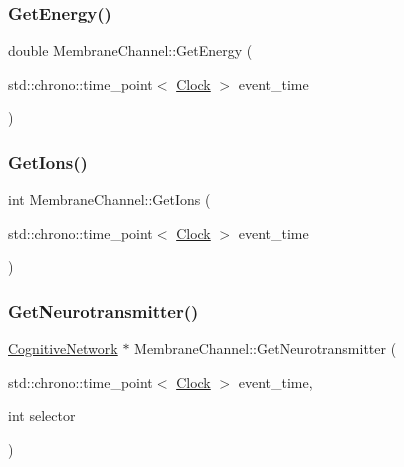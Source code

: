 \mbox{\label{classMembraneChannel_a25b542d8156c42ed785eebbea0db21a7}} 
\subsubsection{\texorpdfstring{Get\+Energy()}{GetEnergy()}}
{\footnotesize\ttfamily double Membrane\+Channel\+::\+Get\+Energy (\begin{DoxyParamCaption}\item[{std\+::chrono\+::time\+\_\+point$<$ \mbox{\hyperlink{universe_8h_a0ef8d951d1ca5ab3cfaf7ab4c7a6fd80}{Clock}} $>$}]{event\+\_\+time }\end{DoxyParamCaption})\hspace{0.3cm}{\ttfamily [inline]}}

\mbox{\label{classMembraneChannel_af20c4ca6a3708c86122e7118a29952fd}} 
\subsubsection{\texorpdfstring{Get\+Ions()}{GetIons()}}
{\footnotesize\ttfamily int Membrane\+Channel\+::\+Get\+Ions (\begin{DoxyParamCaption}\item[{std\+::chrono\+::time\+\_\+point$<$ \mbox{\hyperlink{universe_8h_a0ef8d951d1ca5ab3cfaf7ab4c7a6fd80}{Clock}} $>$}]{event\+\_\+time }\end{DoxyParamCaption})\hspace{0.3cm}{\ttfamily [inline]}}

\mbox{\label{classMembraneChannel_a91ce6506a8e82905de7cd031ed5d63f5}} 
\subsubsection{\texorpdfstring{Get\+Neurotransmitter()}{GetNeurotransmitter()}}
{\footnotesize\ttfamily \mbox{\hyperlink{classCognitiveNetwork}{Cognitive\+Network}} $\ast$ Membrane\+Channel\+::\+Get\+Neurotransmitter (\begin{DoxyParamCaption}\item[{std\+::chrono\+::time\+\_\+point$<$ \mbox{\hyperlink{universe_8h_a0ef8d951d1ca5ab3cfaf7ab4c7a6fd80}{Clock}} $>$}]{event\+\_\+time,  }\item[{int}]{selector }\end{DoxyParamCaption})}

